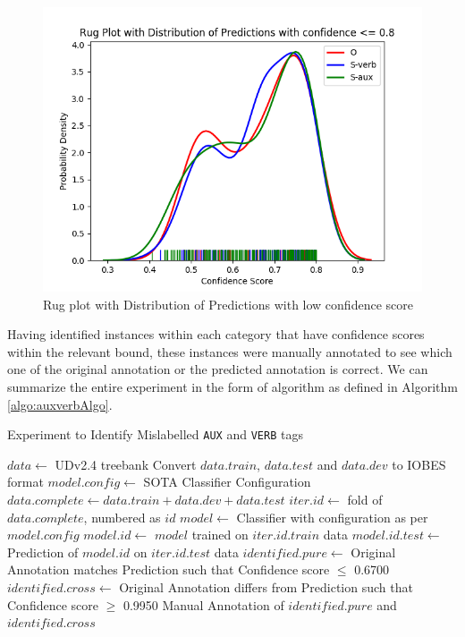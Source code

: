 \begin{figure}[H]
    \centering
    \includegraphics[scale=0.80]{img/aux-verb-distribution.png}
    \caption{Rug plot with Distribution of Predictions with low confidence score}
    \label{fig:auxvsverbsDistribution}
\end{figure}

Having identified instances within each category that have confidence scores within the relevant bound, these instances were manually annotated to see which one of the original annotation or the predicted annotation is correct. We can summarize the entire experiment in the form of algorithm as defined in Algorithm \ref{algo:auxverbAlgo}.

\begin{algorithm}[H]
\caption{Experiment to Identify Mislabelled \texttt{AUX} and \texttt{VERB} tags}
\label{algo:auxverbAlgo}
\begin{algorithmic}[1]
\REQUIRE $data \leftarrow$ UDv2.4 treebank
\STATE Convert $data.train$, $data.test$ and $data.dev$ to IOBES format
\STATE $model.config \leftarrow$ SOTA Classifier Configuration
\STATE $data.complete \leftarrow data.train + data.dev + data.test$
\STATE {}
\STATE $iter.id \leftarrow$ fold of $data.complete$, numbered as $id$
\STATE {}
\STATE $model \leftarrow$ Classifier with configuration as per $model.config$
    \STATE $model.id \leftarrow$ $model$ trained on $iter.id.train$ data
    \STATE $model.id.test \leftarrow$ Prediction of $model.id$ on $iter.id.test$ data
\ENDFOR
\STATE $identified.pure \leftarrow$ Original Annotation matches Prediction such that Confidence score \(\leq\) 0.6700
\STATE $identified.cross \leftarrow$ Original Annotation differs from Prediction such that Confidence score \(\geq\) 0.9950
\STATE Manual Annotation of $identified.pure$ and $identified.cross$
\end{algorithmic}
\end{algorithm}

